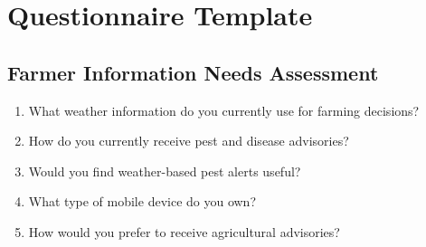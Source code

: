 \documentclass[12pt]{report}
\begin{document}
\appendix
\chapter{Questionnaire Template}
\section{Farmer Information Needs Assessment}
\begin{enumerate}
    \item What weather information do you currently use for farming decisions?
    \item How do you currently receive pest and disease advisories?
    \item Would you find weather-based pest alerts useful?
    \item What type of mobile device do you own?
    \item How would you prefer to receive agricultural advisories?
\end{enumerate}
\end{document}
